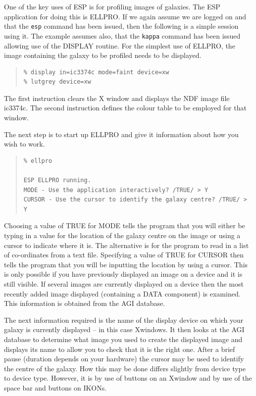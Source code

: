 \documentclass[twoside,11pt]{article}
\newcommand{\xref}[3]{#1}
\newenvironment{myquote}{\begin{quote}\begin{small}}{\end{small}\end{quote}}
\begin{document}
One of the key uses of ESP is for profiling images of galaxies.
The ESP application for doing this is ELLPRO. If we again assume we
are logged on and that the {\tt esp} command has been issued,
then the following is a simple session using it. The example
assumes also, that the {\tt kappa} command has been issued allowing use of the
\xref{DISPLAY}{sun95}{DISPLAY} routine. For the simplest use of ELLPRO, the image containing
the galaxy to be profiled needs to be displayed.

\begin{myquote}
\begin{verbatim}
% display in=ic3374c mode=faint device=xw
% lutgrey device=xw
\end{verbatim}
\end{myquote}

The first instruction clears the X window and displays the NDF image file
ic3374c. The second instruction defines
the colour table to be employed for that window.

The next step is to start up ELLPRO and give it information about how
you wish to work.

\begin{myquote}
\begin{verbatim}
% ellpro

ESP ELLPRO running.
MODE - Use the application interactively? /TRUE/ > Y
CURSOR - Use the cursor to identify the galaxy centre? /TRUE/ > Y
\end{verbatim}
\end{myquote}

Choosing a value of TRUE for MODE tells the program that you will
either be typing in a value for the location of the galaxy centre on the image
or using a cursor to indicate where it is. The alternative is for the program to
read in a list of co-ordinates from a text file. Specifying a value of TRUE
for CURSOR then tells the program that you will be inputting the location by
using a cursor. This is only possible if you have previously displayed an
image on a device and it is still visible. If several images are currently
displayed on a device then the most recently added image displayed
(containing a DATA component) is examined. This information is obtained from
the AGI database.

The next information required is the
name of the display device on which your galaxy is currently displayed --
in this case Xwindows. It then looks at the AGI database to determine
what image you used to create the displayed image and displays its name
to allow you to check that it is the right one. After a brief pause
(duration depends on your hardware) the cursor may be used to identify the
centre of the galaxy. How this may be done differs slightly from device type to
device type. However, it is by use of buttons on an Xwindow and by use
of the space bar and buttons on IKONs.
\end{document}
